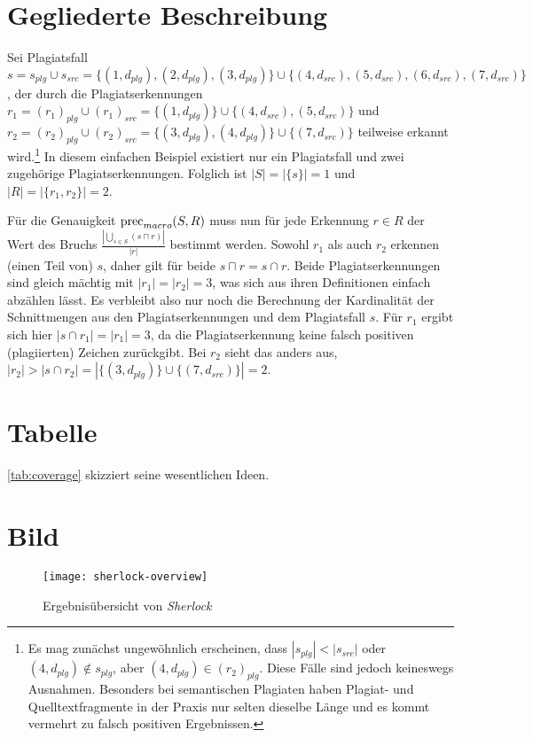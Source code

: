 \section{Gegliederte Beschreibung}
\begin{description}[style=unboxed, leftmargin=0cm]
    \item[Ein Beispiel] Sei Plagiatsfall \(s=s_{plg}\cup s_{src}=\{(1,d_{plg}),(2,d_{plg}),(3,d_{plg})\}\cup\{(4,d_{src}),(5,d_{src}),(6,d_{src}),(7,d_{src})\}\), der durch die Plagiatserkennungen \(r_1=(r_1)_{plg}\cup (r_1)_{src}=\{(1,d_{plg})\}\cup\{(4,d_{src}),(5,d_{src})\}\) und \(r_2=(r_2)_{plg}\cup (r_2)_{src}=\{(3,d_{plg}),(4,d_{plg})\}\cup\{(7,d_{src})\}\) teilweise erkannt wird.\footnote{Es mag zunächst ungewöhnlich erscheinen, dass \(|s_{plg}|<|s_{src}|\) oder \((4,d_{plg})\notin s_{plg}\), aber \((4,d_{plg})\in(r_2)_{plg}\). Diese Fälle sind jedoch keineswegs Ausnahmen. Besonders bei semantischen Plagiaten haben Plagiat- und Quelltextfragmente in der Praxis nur selten dieselbe Länge und es kommt vermehrt zu falsch positiven Ergebnissen.}
    In diesem einfachen Beispiel existiert nur ein Plagiatsfall und zwei zugehörige Plagiatserkennungen.
    Folglich ist \(|S|=|\{s\}|=1\) und \(|R|=|\{r_1,r_2\}|=2\).
    \item[Bestimmung der Genauigkeit] Für die Genauigkeit \(\operatorname{prec}_{macro}(S,R)\) muss nun für jede Erkennung \(r\in R\) der Wert des Bruchs \(\frac{|\bigcup_{s\in S}(s\sqcap r)|}{|r|}\) bestimmt werden.
    Sowohl \(r_1\) als auch \(r_2\) erkennen (einen Teil von) \(s\), daher gilt für beide \(s\sqcap r=s\cap r\).
    Beide Plagiatserkennungen sind gleich mächtig mit \(|r_1|=|r_2|=3\), was sich aus ihren Definitionen einfach abzählen lässt.
    Es verbleibt also nur noch die Berechnung der Kardinalität der Schnittmengen aus den Plagiatserkennungen und dem Plagiatsfall \(s\).
    Für \(r_1\) ergibt sich hier \(|s\cap r_1|=|r_1|=3\), da die Plagiatserkennung keine falsch positiven (plagiierten) Zeichen zurückgibt.
    Bei \(r_2\) sieht das anders aus, \(|r_2|>|s\cap r_2|=|\{(3,d_{plg})\}\cup\{(7,d_{src})\}|=2\).
\end{description}

\section{Tabelle}
\cref{tab:coverage} skizziert seine wesentlichen Ideen.


\section{Bild}
\begin{figure}
    \centering
    \texttt{[image: sherlock-overview]}
    \caption{Ergebnisübersicht von \emph{Sherlock}}\label{fig:sherlockSum}
\end{figure}

